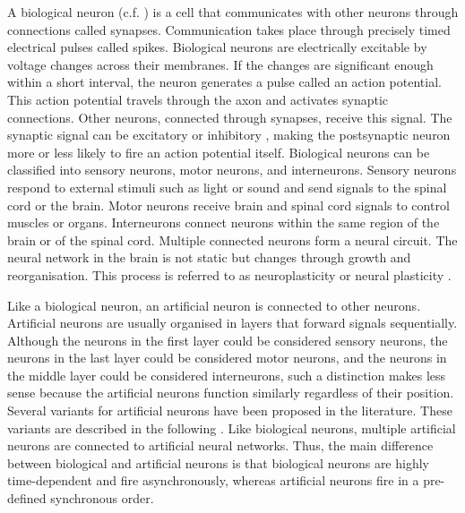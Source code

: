 A biological neuron (c.f. ) is a cell that communicates with other neurons through connections called synapses.
Communication takes place through precisely timed electrical pulses called spikes.
Biological neurons are electrically excitable by voltage changes across their membranes.
If the changes are significant enough within a short interval, the neuron generates a pulse called an action potential.
This action potential travels through the axon and activates synaptic connections.
Other neurons, connected through synapses, receive this signal.
The synaptic signal can be excitatory  or inhibitory , making the postsynaptic neuron more or less likely to fire an action potential itself.
Biological neurons can be classified into sensory neurons, motor neurons, and interneurons.
Sensory neurons respond to external stimuli such as light or sound and send signals to the spinal cord or the brain.
Motor neurons receive brain and spinal cord signals to control muscles or organs.
Interneurons connect neurons within the same region of the brain or of the spinal cord.
Multiple connected neurons form a neural circuit.
The neural network in the brain is not static but changes through growth and reorganisation.
This process is referred to as neuroplasticity or neural plasticity .

Like a biological neuron, an artificial neuron is connected to other neurons.
Artificial neurons are usually organised in layers that forward signals sequentially.
Although the neurons in the first layer could be considered sensory neurons, the neurons in the last layer could be considered motor neurons, and the neurons in the middle layer could be considered interneurons, such a distinction makes less sense because the artificial neurons function similarly regardless of their position.
Several variants for artificial neurons have been proposed in the literature. These variants are described in the following  .
Like biological neurons, multiple artificial neurons are connected to artificial neural networks.
Thus, the main difference between biological and artificial neurons is that biological neurons are highly time-dependent and fire asynchronously, whereas artificial neurons fire in a pre-defined synchronous order.

